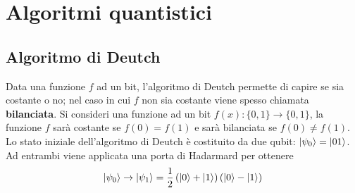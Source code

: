 \documentclass[12pt, a4paper]{report}
\begin{document}
\section{Algoritmi quantistici}
\subsection{Algoritmo di Deutch}
Data una funzione $f$ ad un bit, l'algoritmo di Deutch permette di capire se sia costante o no; nel caso in cui $f$ non sia costante viene spesso chiamata \textbf{bilanciata}. Si consideri una funzione ad un bit $f(x):\{0,1\}\rightarrow\{0,1\}$, la funzione $f$ sarà costante se $f(0)=f(1)$ e sarà bilanciata se $f(0)\neq f(1)$.\\
Lo stato iniziale dell'algoritmo di Deutch è costituito da due qubit: $| \psi_{0} \rangle=| 01 \rangle$. Ad entrambi viene applicata una porta di Hadarmard per  ottenere
\begin{equation*}
    | \psi_{0} \rangle\rightarrow| \psi_{1} \rangle = \frac{1}{2}\left(| 0 \rangle+| 1 \rangle\right)\left(| 0 \rangle-| 1 \rangle\right)
\end{equation*}
\end{document}
